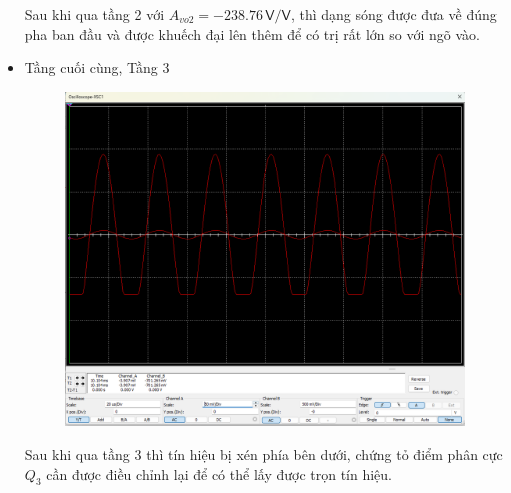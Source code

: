 \begin{itemize}[label=-]
	Sau khi qua tầng 2 với $A_{vo2} = -238.76 \,\textsf{V/V}$, thì dạng sóng được đưa về đúng pha ban đầu và được khuếch đại lên thêm để có trị rất lớn so với ngõ vào.
	
	\item Tầng cuối cùng, Tầng 3
	
	\begin{figure}[H]
		\centering
		\includegraphics[width=.8\linewidth]{./my-chapters/my-images/Question6/c_stage_3.png}
	\end{figure}
	
	Sau khi qua tầng 3 thì tín hiệu bị xén phía bên dưới, chứng tỏ điểm phân cực $Q_{3}$ cần được điều chỉnh lại để có thể lấy được trọn tín hiệu.
	
\end{itemize}